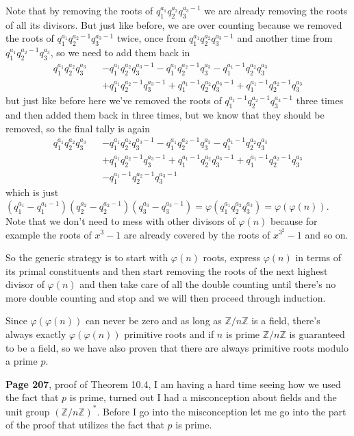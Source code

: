 \documentclass[aps,preprint,preprintnumbers,nofootinbib,showpacs,prd]{revtex4-1}
\newcommand{\nbea}{\begin{eqnarray*}}
\newcommand{\neea}{\end{eqnarray*}}
\begin{document}
Note that by removing the roots of $q_1^{a_1}q_2^{a_2}q_3^{a_3-1}$ we are already removing the roots of all its divisors. But just like before, we are over counting because we removed the roots of $q_1^{a_1}q_2^{a_2-1}q_3^{a_3-1}$ twice, once from $q_1^{a_1}q_2^{a_2}q_3^{a_3-1}$ and another time from $q_1^{a_1}q_2^{a_2-1}q_3^{a_3}$, so we need to add them back in
%
\nbea
q_1^{a_1}q_2^{a_2}q_3^{a_3} &&  - q_1^{a_1}q_2^{a_2}q_3^{a_3-1} - q_1^{a_1}q_2^{a_2-1}q_3^{a_3}- q_1^{a_1-1}q_2^{a_2}q_3^{a_3} \\
&& + q_1^{a_1}q_2^{a_2-1}q_3^{a_3-1} + q_1^{a_1-1}q_2^{a_2}q_3^{a_3-1} + q_1^{a_1-1}q_2^{a_2-1}q_3^{a_3}
\neea
%
but just like before here we've removed the roots of $q_1^{a_1-1}q_2^{a_2-1}q_3^{a_3-1}$ three times and then added them back in three times, but we know that they should be removed, so the final tally is again
%
\nbea
q_1^{a_1}q_2^{a_2}q_3^{a_3} &&  - q_1^{a_1}q_2^{a_2}q_3^{a_3-1} - q_1^{a_1}q_2^{a_2-1}q_3^{a_3}- q_1^{a_1-1}q_2^{a_2}q_3^{a_3} \\
&& + q_1^{a_1}q_2^{a_2-1}q_3^{a_3-1} + q_1^{a_1-1}q_2^{a_2}q_3^{a_3-1} + q_1^{a_1-1}q_2^{a_2-1}q_3^{a_3} \\
&& -q_1^{a_1-1}q_2^{a_2-1}q_3^{a_3-1}
\neea
%
which is just $(q_1^{a_1} - q_1^{a_1-1})(q_2^{a_2}-q_2^{a_2-1})(q_3^{a_3} - q_3^{a_3-1}) =\varphi(q_1^{a_1}q_2^{a_2}q_3^{a_3}) = \varphi(\varphi(n))$. Note that we don't need to mess with other divisors of $\varphi(n)$ because for example the roots of $x^3 - 1$ are already covered by the roots of $x^{3^2} - 1$ and so on.

So the generic strategy is to start with $\varphi(n)$ roots, express $\varphi(n)$ in terms of its primal constituents and then start removing the roots of the next highest divisor of $\varphi(n)$ and then take care of all the double counting until there's no more double counting and stop and we will then proceed through induction.

Since $\varphi(\varphi(n))$ can never be zero and as long as $\mathbb{Z}/n\mathbb{Z}$ is a field, there's always exactly $\varphi(\varphi(n))$ primitive roots and if $n$ is prime $\mathbb{Z}/n\mathbb{Z}$ is guaranteed to be a field, so we have also proven that there are always primitive roots modulo a prime $p$.

{\bf Page 207}, proof of Theorem 10.4, I am having a hard time seeing how we used the fact that $p$ is prime, turned out I had a misconception about fields and the unit group $(\mathbb{Z}/n\mathbb{Z})^*$. Before I go into the misconception let me go into the part of the proof that utilizes the fact that $p$ is prime.
\end{document}
